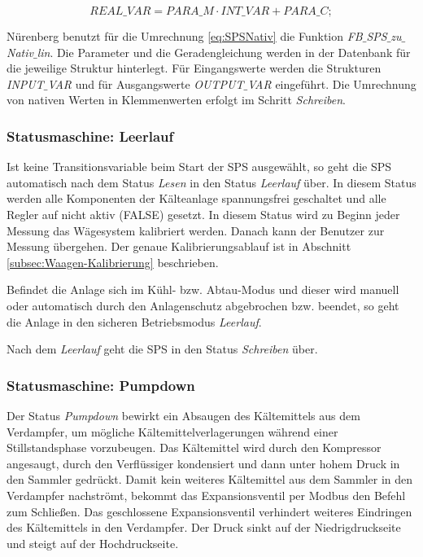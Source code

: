 \begin{equation}
REAL\_VAR = PARA\_M\cdot INT\_VAR + PARA\_C; 
\label{eq:SPSNativ}
\end{equation}

Nürenberg \citep{Nuerenberg2015}  benutzt für die Umrechnung \ref{eq:SPSNativ} die Funktion \textit{FB$\_$SPS$\_$zu$\_$Nativ$\_$lin}. Die Parameter und die Geradengleichung werden in der Datenbank für die jeweilige Struktur hinterlegt. Für Eingangswerte werden die Strukturen \textit{INPUT$\_$VAR} und für Ausgangswerte \textit{OUTPUT$\_$VAR} eingeführt. Die Umrechnung von nativen Werten in Klemmenwerten erfolgt im Schritt \textit{Schreiben}.

\subsubsection*{Statusmaschine: Leerlauf}

Ist keine Transitionsvariable beim Start der SPS ausgewählt, so geht die SPS automatisch nach dem Status \textit{Lesen} in den Status \textit{Leerlauf} über. In diesem Status werden alle Komponenten der Kälteanlage spannungsfrei geschaltet und alle Regler auf nicht aktiv (FALSE) gesetzt. In diesem Status wird zu Beginn jeder Messung das Wägesystem kalibriert werden. Danach kann der Benutzer zur Messung übergehen. Der genaue Kalibrierungsablauf ist in Abschnitt  \ref{subsec:Waagen-Kalibrierung} beschrieben. 

Befindet die Anlage sich im Kühl- bzw. Abtau-Modus und dieser wird manuell oder automatisch durch den Anlagenschutz abgebrochen bzw. beendet, so geht die Anlage in den sicheren Betriebsmodus \textit{Leerlauf}.  

Nach dem \textit{Leerlauf} geht die SPS in den Status \textit{Schreiben} über.  

\subsubsection*{Statusmaschine: Pumpdown}

Der Status \textit{Pumpdown} bewirkt ein Absaugen des Kältemittels aus dem Verdampfer, um mögliche Kältemittelverlagerungen während einer Stillstandsphase vorzubeugen.  Das Kältemittel wird durch den Kompressor angesaugt, durch den Verflüssiger kondensiert und dann unter hohem Druck in den Sammler gedrückt. Damit kein weiteres Kältemittel aus dem Sammler in den Verdampfer nachströmt, bekommt das Expansionsventil per Modbus den Befehl zum Schließen. Das geschlossene Expansionsventil verhindert weiteres Eindringen des Kältemittels in den Verdampfer. Der Druck sinkt auf der Niedrigdruckseite und steigt auf der Hochdruckseite. 

